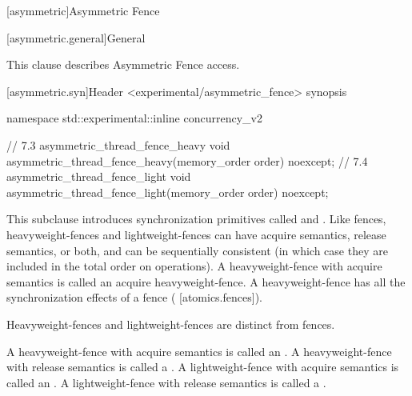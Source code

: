 
[asymmetric]{Asymmetric Fence}

[asymmetric.general]{General}

This clause describes Asymmetric Fence access. 


[asymmetric.syn]{Header <experimental/asymmetric_fence> synopsis}


\begin{codeblock}
namespace std::experimental::inline concurrency_v2 {


// 7.3 asymmetric_thread_fence_heavy
void asymmetric_thread_fence_heavy(memory_order order) noexcept;
// 7.4 asymmetric_thread_fence_light
void asymmetric_thread_fence_light(memory_order order) noexcept;


}
\end{codeblock}

\pnum

This subclause introduces synchronization primitives called  and
. Like fences, heavyweight-fences and lightweight-fences can have acquire
semantics, release semantics, or both, and can be sequentially consistent (in which case they
are included in the total order  on  operations). A heavyweight-fence
with acquire semantics is called an acquire heavyweight-fence. A heavyweight-fence has all the
synchronization effects of a fence ( [atomics.fences]). \begin{note}  Heavyweight-fences and
lightweight-fences are distinct from fences. \end{note}

\pnum
A heavyweight-fence with acquire semantics is called an . A
heavyweight-fence with release semantics is called a . A
lightweight-fence with acquire semantics is called an . A
lightweight-fence with release semantics is called a .

